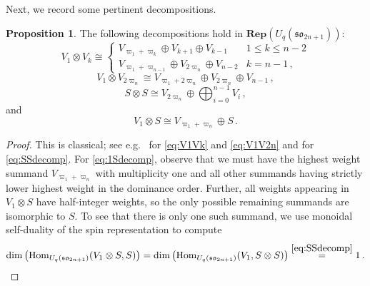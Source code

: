 \documentclass[10pt]{amsart}
\numberwithin{equation}{section}
\theoremstyle{definition}
\newtheorem{prop}[thm]{Proposition}
\newcommand{\Hom}{{\rm Hom}}
\newcommand{\son}[1][2n+1]{\mathfrak{so}_{#1}}
\newcommand{\Rep}{\mathbf{Rep}}
\begin{document}
Next, we record some pertinent decompositions.

\begin{prop}
	\label{prop:decomp}
The following decompositions hold in $\Rep(U_q(\son))$:
\begin{equation} \label{eq:V1Vk}
V_1 \otimes V_k \cong
\begin{cases}
V_{\varpi_1+\varpi_k} \oplus V_{k+1} \oplus V_{k-1} & 1 \leq k \leq n-2 \\
V_{\varpi_1+\varpi_{n-1}} \oplus V_{2\varpi_n} \oplus V_{n-2} & k = n-1 \, ,
	\end{cases}
\end{equation}
\begin{equation} \label{eq:V1V2n}
V_1 \otimes V_{2\varpi_n} \cong
V_{\varpi_1+2\varpi_n} \oplus V_{2\varpi_n} \oplus V_{n-1} \, ,
	\end{equation}
\begin{equation} \label{eq:SSdecomp}
S \otimes S \cong V_{2\varpi_n} \oplus \bigoplus_{i=0}^{n-1} V_i \, ,
	\end{equation}
and
\begin{equation} \label{eq:1Sdecomp} 
V_1 \otimes S \cong V_{\varpi_1 + \varpi_n} \oplus S \, . 
	\end{equation}
	\end{prop}	
\begin{proof}
This is classical; 
see e.g.~\cite{YDM} for \eqref{eq:V1Vk} and \eqref{eq:V1V2n}
and \cite[Exercise 19.16]{FultonHarris} for \eqref{eq:SSdecomp}.
For \eqref{eq:1Sdecomp}, 
observe that we must have the highest weight summand $V_{\varpi_1 + \varpi_n}$ 
with multiplicity one and all other summands having strictly lower highest weight in the dominance order.
Further, all weights appearing in $V_1 \otimes S$ have half-integer weights, 
so the only possible remaining summands are isomorphic to $S$.
To see that there is only one such summand, we use monoidal self-duality of the spin representation to compute
\[
\dim \big( \Hom_{U_q(\son)}(V_1 \otimes S, S) \big) = \dim \big( \Hom_{U_q(\son)}(V_1, S \otimes S) \big)
\stackrel{{\eqref{eq:SSdecomp}}}{=} 1\, . \qedhere
	\]
\end{proof}
\end{document}
